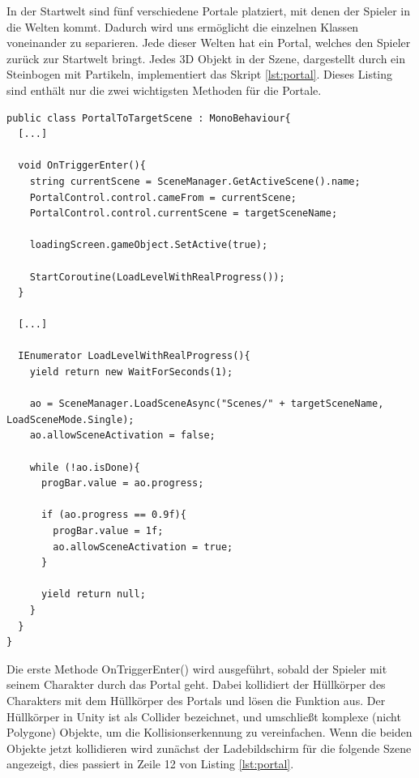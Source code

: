 			In der Startwelt sind fünf verschiedene Portale platziert, mit denen der Spieler in die Welten kommt. Dadurch wird uns ermöglicht die einzelnen Klassen voneinander zu separieren. Jede dieser Welten hat ein Portal, welches den Spieler zurück zur Startwelt bringt. Jedes 3D Objekt in der Szene, dargestellt durch ein Steinbogen mit Partikeln, implementiert das Skript \ref{lst:portal}. Dieses Listing sind enthält nur die zwei wichtigsten Methoden für die Portale.

\begin{scriptsize}
	\lstset{
		float,
		caption=Skript: PortalToTargetScene.cs, 
		language=[Sharp]C, 
		frame=single,  
		showstringspaces=false, 
		showspaces=false, 
		numbers=left, 
		captionpos=b, 
		belowcaptionskip=4pt,
		basicstyle=\ttfamily
	} 
	\begin{lstlisting}[label=lst:portal]
public class PortalToTargetScene : MonoBehaviour{
  [...]
	
  void OnTriggerEnter(){
    string currentScene = SceneManager.GetActiveScene().name;
    PortalControl.control.cameFrom = currentScene;
    PortalControl.control.currentScene = targetSceneName;
	
    loadingScreen.gameObject.SetActive(true);

    StartCoroutine(LoadLevelWithRealProgress());
  }
	
  [...]

  IEnumerator LoadLevelWithRealProgress(){
    yield return new WaitForSeconds(1);
	
    ao = SceneManager.LoadSceneAsync("Scenes/" + targetSceneName, LoadSceneMode.Single);
    ao.allowSceneActivation = false;

    while (!ao.isDone){
      progBar.value = ao.progress;
	
      if (ao.progress == 0.9f){
        progBar.value = 1f;
        ao.allowSceneActivation = true;
      }
	
      yield return null;
    }
  }
}
	\end{lstlisting}
\end{scriptsize}

			Die erste Methode OnTriggerEnter() wird ausgeführt, sobald der Spieler mit seinem Charakter durch das Portal geht. Dabei kollidiert der Hüllkörper des Charakters mit dem Hüllkörper des Portals und lösen die Funktion aus. Der Hüllkörper in Unity ist als Collider bezeichnet, und umschließt komplexe (nicht Polygone) Objekte, um die Kollisionserkennung zu vereinfachen. Wenn die beiden Objekte jetzt kollidieren wird zunächst der Ladebildschirm für die folgende Szene angezeigt, dies passiert in Zeile 12 von Listing \ref{lst:portal}. 
	
